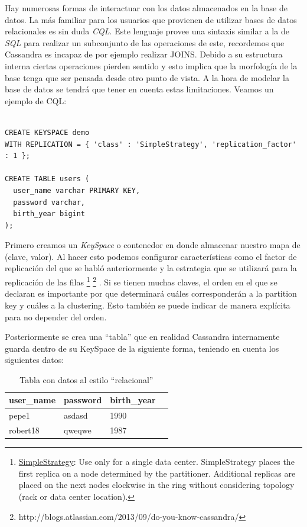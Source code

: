 \documentclass[11pt,a4paper]{article}
\begin{document}
Hay numerosas formas de interactuar con los datos almacenados en la base de datos. La más familiar para los usuarios que provienen de utilizar bases de datos relacionales es sin duda \textit{CQL}. Este lenguaje provee una sintaxis similar a la de \textit{SQL} para realizar un subconjunto de las operaciones de este, recordemos que Cassandra es incapaz de por ejemplo realizar JOINS. Debido a su estructura interna ciertas operaciones pierden sentido y esto implica que la morfología de la base tenga que ser pensada desde otro punto de vista. A la hora de modelar la base de datos se tendrá que tener en cuenta estas limitaciones. Veamos un ejemplo de CQL:

\begin{lstlisting}

CREATE KEYSPACE demo
WITH REPLICATION = { 'class' : 'SimpleStrategy', 'replication_factor' : 1 };

CREATE TABLE users (
  user_name varchar PRIMARY KEY,
  password varchar,
  birth_year bigint
);
 \end{lstlisting}

Primero creamos un \textit{KeySpace} o contenedor en donde almacenar nuestro mapa de (clave, valor). Al hacer esto podemos configurar características como el factor de replicación del que se habló anteriormente y la estrategia que se utilizará para la replicación de las filas \footnote{ \href{http://docs.datastax.com/en/cassandra/2.0/cassandra/architecture/architectureDataDistributeReplication_c.html}{SimpleStrategy}:
Use only for a single data center. SimpleStrategy places the first replica on a node determined by the partitioner. Additional replicas are placed on the next nodes clockwise in the ring without considering topology (rack or data center location).} \footnote{http://blogs.atlassian.com/2013/09/do-you-know-cassandra/} . Si se tienen muchas claves, el orden en el que se declaran es importante por que determinará cuáles corresponderán a la partition key y cuáles a la clustering. Esto también se puede indicar de manera explícita para no depender del orden.

Posteriormente se crea una ``tabla'' que en realidad Cassandra internamente guarda dentro de su KeySpace de la siguiente forma, teniendo en cuenta los siguientes datos:

\begin{table}[h]
\centering
\caption{Tabla con datos al estilo ``relacional''}
\label{my-label}
\begin{tabular}{|l|l|l|l|}
\hline
user\_name & password & birth\_year \\ \hline
pepe1      & asdasd   & 1990        \\ \hline
robert18   & qweqwe   & 1987        \\ \hline
\end{tabular}
\end{table}
\end{document}
